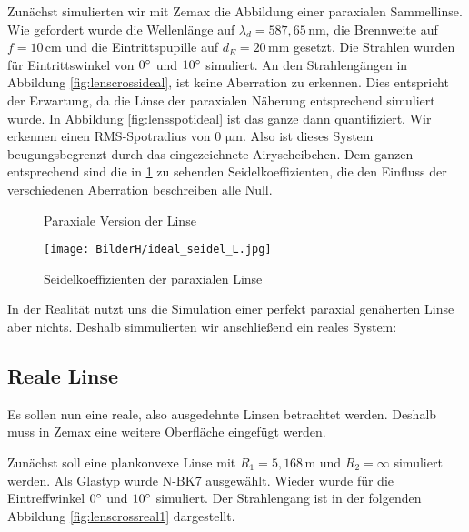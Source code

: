 \documentclass[twoside,colorback,accentcolor=tud4c,11pt]{tudreport}
\begin{document}
		Zunächst simulierten wir mit Zemax die Abbildung einer paraxialen Sammellinse. Wie gefordert wurde die Wellenlänge auf $\lambda_d = 587,65 \mathrm{\,nm}$, die Brennweite auf $f = 10 \, \text{cm}$ und die Eintrittspupille auf $d_E = 20 \mathrm{\,mm}$ gesetzt. Die Strahlen wurden für Eintrittswinkel von $0\degree$ und $10\degree$ simuliert. An den Strahlengängen in Abbildung \ref{fig:lenscrossideal}, ist keine Aberration zu erkennen. Dies entspricht der Erwartung, da die Linse der paraxialen Näherung entsprechend simuliert wurde. In Abbildung \ref{fig:lensspotideal} ist das ganze dann quantifiziert. Wir erkennen einen RMS-Spotradius von $0 \, \mathrm{\,\mu m}$. Also ist dieses System beugungsbegrenzt durch das eingezeichnete Airyscheibchen. Dem ganzen entsprechend sind die in \ref{fig:lensseidelideal} zu sehenden Seidelkoeffizienten, die den Einfluss der verschiedenen Aberration beschreiben alle Null. 
		
	\begin{figure}[H]
\centering
  \quad
  \quad   
  \caption{Paraxiale Version der Linse}
  
\end{figure}		
		
\begin{figure}[H]
\centering
   	\begin{minipage}[b]{\textwidth}
 \centering  	\texttt{[image: BilderH/ideal\_seidel\_L.jpg]}
   	\caption{Seidelkoeffizienten der paraxialen Linse}\label{fig:lensseidelideal}
  	\end{minipage}
\end{figure}		
		
		In der Realität nutzt uns die Simulation einer perfekt paraxial genäherten Linse aber nichts. Deshalb simmulierten wir anschließend ein reales System:
		
		\subsection{Reale Linse}
		
		Es sollen nun eine reale, also ausgedehnte Linsen betrachtet werden. Deshalb muss in Zemax eine weitere Oberfläche eingefügt werden. 
		
		Zunächst soll eine plankonvexe Linse mit $R_1 = 5,168 \mathrm{\,m}$ und $R_2 = \infty$ simuliert werden. Als Glastyp wurde N-BK7 ausgewählt. Wieder wurde für die Eintreffwinkel $0\degree$ und $10\degree$ simuliert. Der Strahlengang ist in der folgenden Abbildung \ref{fig:lenscrossreal1} dargestellt.
		
\end{document}
